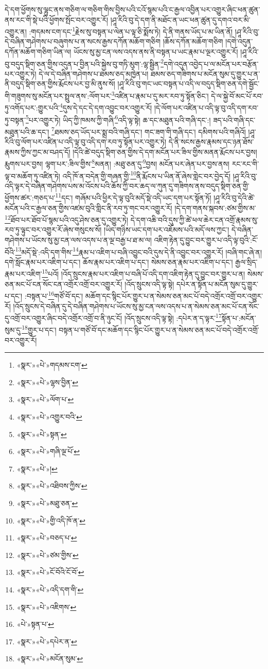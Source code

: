 དེ་དག་ཕྱོགས་སུ་ལྷུང་ནས་གཅིག་ལ་གཅིག་གིས་བྱིས་པའི་ངའོ་སྙམ་པའི་ང་རྒྱལ་འབྱིན་པར་འགྱུར་ཞིང་ཕན་ཚུན་ནས་རང་གི་སྡེ་པའི་ཕྱོགས་སྤོང་བར་འགྱུར་རོ། །ཤཱ་རིའི་བུ་དེ་དག་ནི་མཐོང་ན་ཡང་ཕན་ཚུན་དུ་དགའ་བར་མི་འགྱུར་ན། :གདམས་ངག་དང་\footnote{«སྣར་»«པེ་»གདམས་ངག་}རྗེས་སུ་བསྟན་པ་ལེན་པ་ལྟ་ཅི་སྨོས་ཏེ། དེ་ནི་གནས་ཡོད་པ་མ་ཡིན་ནོ། །ཤཱ་རིའི་བུ་དེ་བཞིན་གཤེགས་པ་བཞུགས་པ་ན་སངས་རྒྱས་དཀོན་མཆོག་གཅིག །ཆོས་དཀོན་མཆོག་གཅིག །དགེ་འདུན་དཀོན་མཆོག་གཅིག་ཡིན་ལ། ཡོངས་སུ་མྱ་ངན་ལས་འདས་ནས་ནི་བསྟན་པ་ཡང་རྣམ་པ་ལྔར་འགྱུར་རོ། །ཤཱ་རིའི་བུ་བདུད་སྡིག་ཅན་གྱིས་འདུན་པ་བྱིན་པའི་སྐྱེས་བུ་གཏི་མུག་:ལྷ་སྦྱིན་\footnote{«སྣར་»«པེ་»ལྷས་བྱིན་}དགེ་འདུན་འབྱེད་པ་ལ་མངོན་པར་བརྩོན་པར་འགྱུར་ཏེ། དེ་ལ་དེ་བཞིན་གཤེགས་པ་ཐམས་ཅད་མཁྱེན་པ། ཐམས་ཅད་གཟིགས་པ་མངོན་སུམ་དུ་གྱུར་པ་ན་ནི་བདུད་སྡིག་ཅན་གྱིས་རྨོངས་པར་བྱ་མི་ནུས་སོ། །ཤཱ་རིའི་བུ་གང་ཡང་བསྟན་པ་འདི་ལ་བདུད་སྡིག་ཅན་དགེ་སྦྱོང་གི་གཟུགས་སུ་མངོན་པར་སྤྲུལ་ནས་:ལོག་པར་\footnote{«སྣར་»«པེ་»ལོག་པ་}འཛིན་པ་རྣམ་པ་དུ་མར་རབ་ཏུ་སྟོན་ཅིང་། དེ་ལ་སྐྱེ་བོ་མང་པོ་རབ་ཏུ་འགོད་པར་:གྱུར་པའི་\footnote{«སྣར་»«པེ་»འགྱུར་བའི་}དུས་དེ་དང་དེ་དག་འབྱུང་བར་འགྱུར་རོ། །དེ་ལོག་པར་འཛིན་པ་འདི་ལྟ་བུ་འདི་དག་རབ་ཏུ་བསྟན་\footnote{«སྣར་»«པེ་»སྟན་}པར་འགྱུར་ཏེ། ཡིད་ཀྱི་ཁམས་ཀྱི་གཞི་\footnote{«སྣར་»«པེ་»གཞི་ལྔ་པོ་}འདི་ལྟ་སྟེ། ཆ་དང་མཐུན་པའི་གཞི་དང་:། ཟད་པའི་གཞི་དང་མཐུན་པའི་ཆ་དང་། \footnote{«སྣར་»«པེ་»།  }ཐམས་ཅད་ཡོད་པར་སྨྲ་བའི་གཞི་དང་། གང་ཟག་གི་གཞི་དང་། དམིགས་པའི་གཞིའོ། །ཤཱ་རིའི་བུ་ལོག་པར་འཛིན་པ་འདི་ལྟ་བུ་འདི་དག་རབ་ཏུ་སྟོན་པར་འགྱུར་ཏེ། དེ་ནི་སངས་རྒྱས་རྣམས་དང་ཉན་ཐོས་རྣམས་ཀྱིས་ཀྱང་མ་བཤད་དོ། །དེའི་ཚེ་བདུད་སྡིག་ཅན་གྱིས་དེ་དག་མངོན་པར་ཟིལ་གྱིས་མནན་རྨོངས་པར་བྱས། རྨུགས་པར་བྱས། ལྷག་པར་:ཟིལ་གྱིས་\footnote{«སྣར་»«པེ་»འཐིབས་ཀྱིས་}མནན། :མཐུ་ཅན་དུ་\footnote{«སྣར་»«པེ་»མཐུ་ཅན་}བྱས། མངོན་པར་ཞེན་པར་བྱས་ནས། རང་རང་གི་ལྟ་བ་མཆོག་ཏུ་འཛིན་ཏེ། འདི་ཁོ་ན་བདེན་གྱི་གཞན་གྱི་\footnote{«སྣར་»«པེ་»གྱི་འདི་ཁོ་ན་}ནི་རྨོངས་པ་ཡིན་ནོ་ཞེས་གླེང་བར་བྱེད་དོ། །ཤཱ་རིའི་བུ་འདི་ལྟར་དེ་བཞིན་གཤེགས་པས་མ་འོངས་པའི་ཆོས་ཀྱི་བར་ཆད་ལ་ཀུན་དུ་གཟིགས་ནས་བདུད་སྡིག་ཅན་གྱི་ཕྱོགས་ཚར་:གཅད་པ་\footnote{«སྣར་»«པེ་»བཅད་པ་}དང་། གཞོམ་པའི་ཕྱིར་དེ་ལྟ་བུའི་མདོ་སྡེ་འདི་ཡང་དག་པར་སྟོན་ཏོ། །ཤཱ་རིའི་བུ་དེའི་ཚེ་མངོན་པའི་ང་རྒྱལ་ཅན་གྱིས་འཛམ་བུའི་གླིང་ནི་རབ་ཏུ་གང་བར་འགྱུར་རོ། །དེ་དག་གནས་སྐབས་:ཙམ་གྱིས་མ་\footnote{«སྣར་»«པེ་»ཙམ་གྱིས་}ཐོབ་པར་ཐོབ་པོ་སྙམ་པའི་འདུ་ཤེས་ཅན་དུ་འགྱུར་ཏེ། དེ་དག་འཆི་བའི་དུས་ཀྱི་ཚེ་ཕལ་ཆེར་ངན་འགྲོ་རྣམས་སུ་རབ་ཏུ་ལྟུང་བར་འགྱུར་རོ་ཞེས་གསུངས་སོ། །ཡིད་གཉིས་ཡང་དག་པར་འཇོམས་པའི་མདོ་ལས་ཀྱང་། དེ་བཞིན་གཤེགས་པ་ཡོངས་སུ་མྱ་ངན་ལས་འདས་པ་ན་ལྔ་བརྒྱ་པ་ཐ་མ་ལ། འཇིག་རྟེན་དུ་བྱུང་བར་གྱུར་པ་འདི་ལྟ་བུའི་:ངོ་བོའི་\footnote{«སྣར་»«པེ་»ངོ་བོའི་ངོ་བོ་}མདོ་སྡེ་:འདི་དག་གིས་\footnote{«སྣར་»«པེ་»འདི་དག་གི་}རྣམ་པ་འཇིག་པ་བཞི་འབྱུང་བའི་དུས་དེ་ནི་འབྱུང་བར་འགྱུར་རོ། །བཞི་གང་ཞེ་ན། དགེ་སློང་རྣམ་པར་འཇིག་པ་དང་། ཆོས་རྣམ་པར་འཇིག་པ་དང་། སེམས་ཅན་རྣམ་པར་འཇིག་པ་དང་། རྒྱལ་སྲིད་རྣམ་པར་འཇིག་\footnote{«སྣར་»«པེ་»འཇིགས་}པའོ། །འོད་སྲུངས་རྣམ་པར་འཇིག་པ་བཞི་པོ་འདི་དག་འཇིག་རྟེན་དུ་བྱུང་བར་གྱུར་པ་ན། སེམས་ཅན་མང་པོ་ངན་སོང་ངན་འགྲོར་འགྲོ་བར་འགྱུར་རོ། །འོད་སྲུངས་འདི་ལྟ་སྟེ། དཔེར་ན་སྟོན་པ་མངོན་སུམ་དུ་གྱུར་པ་དང་། :བསྟན་པ་\footnote{«པེ་»སྟན་པ་}གཙོ་བོ་དང་། མཆོག་དང་སྙིང་པོར་གྱུར་པ་ན་སེམས་ཅན་མང་པོ་བདེ་འགྲོར་འགྲོ་བར་འགྱུར་རོ། །འོད་སྲུངས་དེ་བཞིན་དུ་དེ་བཞིན་གཤེགས་པ་ཡོངས་སུ་མྱ་ངན་ལས་འདས་པ་ན་སེམས་ཅན་མང་པོ་ངན་སོང་དུ་འགྲོ་བར་འགྱུར་ཞིང་བདེ་འགྲོར་འགྲོ་བ་ནི་ཉུང་ངོ། །འོད་སྲུངས་འདི་ལྟ་སྟེ། :དཔེར་ན་ད་ལྟར་\footnote{«སྣར་»«པེ་»དཔེར་ན་}སྟོན་པ་:མངོན་སུམ་དུ་\footnote{«སྣར་»«པེ་»མངོན་སུམ་}གྱུར་པ་དང་། བསྟན་པ་གཙོ་བོ་དང་མཆོག་དང་སྙིང་པོར་གྱུར་པ་ན་སེམས་ཅན་མང་པོ་བདེ་འགྲོར་འགྲོ་བར་འགྱུར་རོ། 